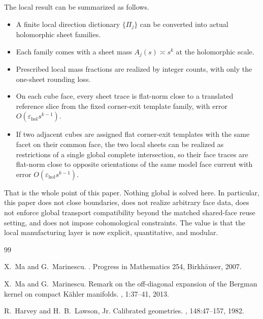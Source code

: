 \documentclass[11pt]{article}
\numberwithin{equation}{section}
\theoremstyle{plain}
\theoremstyle{definition}
\theoremstyle{remark}
\newcommand{\eps}{\varepsilon}
\begin{document}
The local result can be summarized as follows.

\begin{itemize}
\item A finite local direction dictionary $\{\Pi_j\}$ can be converted into actual holomorphic sheet families.
\item Each family comes with a sheet mass $A_j(s)\asymp s^k$ at the holomorphic scale.
\item Prescribed local mass fractions are realized by integer counts, with only the one-sheet rounding loss.
\item On each cube face, every sheet trace is flat-norm close to a translated reference slice from the fixed corner-exit template family, with error $O(\eps_{\mathrm{hol}}s^{k-1})$.
\item If two adjacent cubes are assigned flat corner-exit templates with the same facet on their common face, the two local sheets can be realized as restrictions of a single global complete intersection, so their face traces are flat-norm close to opposite orientations of the same model face current with error $O(\eps_{\mathrm{hol}}s^{k-1})$.
\end{itemize}

That is the whole point of this paper.  Nothing global is solved here.  In particular, this paper does not close boundaries, does not realize arbitrary face data, does not enforce global transport compatibility beyond the matched shared-face reuse setting, and does not impose cohomological constraints.  The value is that the local manufacturing layer is now explicit, quantitative, and modular.

\begin{thebibliography}{99}

X.~Ma and G.~Marinescu.
.
\newblock Progress in Mathematics 254, Birkh\"auser, 2007.

X.~Ma and G.~Marinescu.
\newblock Remark on the off-diagonal expansion of the Bergman kernel on compact K\"ahler manifolds.
, 1:37--41, 2013.

R.~Harvey and H.~B.~Lawson, Jr.
\newblock Calibrated geometries.
, 148:47--157, 1982.

\end{thebibliography}
\end{document}
